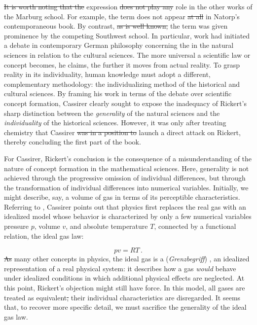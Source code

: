 \documentclass[submitted,12pt]{article}
\providecommand{\DIFadd}[1]{{\protect\color{blue}\uwave{#1}}} %
\providecommand{\DIFdel}[1]{{\protect\color{red}\sout{#1}}}                      %
\providecommand{\DIFaddbegin}{} %
\providecommand{\DIFaddend}{} %
\providecommand{\DIFdelbegin}{} %
\providecommand{\DIFdelend}{} %
\begin{document}
\DIFdelbegin \DIFdel{It is worth noting that the }\DIFdelend \DIFaddbegin \DIFadd{The }\DIFaddend expression   \DIFdelbegin \DIFdel{does not play any }\DIFdelend \DIFaddbegin \DIFadd{plays no }\DIFaddend role in the other works of the Marburg school. For example, the term does not appear \DIFdelbegin \DIFdel{at all }\DIFdelend in Natorp's contemporaneous \citeyear{Natorp1910a} book. By contrast, \DIFdelbegin \DIFdel{as is well known, }\DIFdelend the term was given prominence by the competing Southwest school. In particular,  work had initiated a debate in contemporary German philosophy concerning the  in the natural sciences in relation to the cultural sciences. The more universal a scientific law or concept becomes, he claims, the further it moves from actual reality. To grasp reality in its individuality, human knowledge must adopt a different, complementary methodology: the individualizing method of the historical and cultural sciences. By framing his work in terms of the debate over scientific concept formation, Cassirer clearly sought to expose the inadequacy of Rickert's sharp distinction between the \emph{generality} of the natural sciences and the \emph{individuality} of the historical sciences. However, it was only after treating chemistry that Cassirer \DIFdelbegin \DIFdel{was in a position to }\DIFdelend \DIFaddbegin \DIFadd{could }\DIFaddend launch a direct attack on Rickert, thereby concluding the first part of the book.

For Cassirer, Rickert's conclusion is the consequence of a misunderstanding of the nature of concept formation in the mathematical sciences. Here, generality is not achieved through the progressive omission of individual differences, but through the transformation of individual differences into numerical variables. Initially, we might describe, say, a volume of gas in terms of its perceptible characteristics. Referring to \citet{Duhem1906}, Cassirer points out that physics first replaces the real gas with an idealized model whose behavior is characterized by only a few numerical variables \SF{189--90}{143--44}\DIFdelbegin \DIFdel{, }\DIFdelend \DIFaddbegin \DIFadd{: }\DIFaddend pressure $p$, volume $v$, and absolute temperature $T$, connected by a functional relation, the ideal gas law:  

\begin{equation*}
pv=RT\,.  
\end{equation*}
%
\DIFdelbegin \DIFdel{As }\DIFdelend \DIFaddbegin \DIFadd{Like }\DIFaddend many other concepts in physics, the ideal gas is a \DIFdelbegin %
\DIFdelend \DIFaddbegin {} \DIFaddend (\emph{Grenzbegriff}) , an idealized representation of a real physical system: it describes how a gas \emph{would} behave under idealized conditions in which additional physical effects are neglected. At this point, Rickert's objection might still have force. In this model, all gases are treated as equivalent\DIFdelbegin \DIFdel{, }\DIFdelend \DIFaddbegin \DIFadd{; }\DIFaddend their individual characteristics are disregarded. It seems that, to recover more specific detail, we must sacrifice the generality of the ideal gas law.
\end{document}
